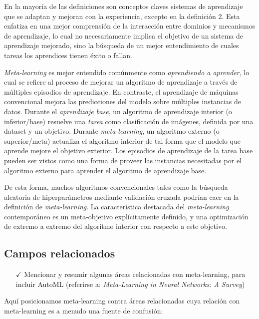 En la mayoría de las definiciones son conceptos claves sistemas de aprendizaje que se adaptan y mejoran con la experiencia, excepto en la definición 2. Esta enfatiza en una mejor comprensión de la interacción entre dominios y mecanismos de aprendizaje, lo cual no necesariamente implica el objetivo de un sistema de aprendizaje mejorado, sino la búsqueda de un mejor entendimiento de cuales tareas los aprendices tienen éxito o fallan.

\emph{Meta-learning} es mejor entendido comúnmente como \textit{aprendiendo a aprender}, lo cual se refiere al proceso de mejorar un algoritmo de aprendizaje a través de múltiples episodios de aprendizaje. En contraste, el aprendizaje de máquinas convencional mejora las predicciones del modelo sobre múltiples instancias de datos. Durante el \textit{aprendizaje base}, un algoritmo de aprendizaje interior (o inferior/base) resuelve una \textit{tarea} como clasificación de imágenes, definida por una dataset y un objetivo. Durante \emph{meta-learning}, un algoritmo externo (o superior/meta) actualiza el algoritmo interior de tal forma que el modelo que aprende mejore el objetivo exterior. Los episodios de aprendizaje de la tarea base pueden ser vistos como una forma de proveer las instancias necesitadas por el algoritmo externo para aprender el algoritmo de aprendizaje base. 

De esta forma, muchos algoritmos convencionales tales como la búsqueda aleatoria de hiperparámetros mediante validación cruzada podrían caer en la definición de \emph{meta-learning}. La característica destacada del \emph{meta-learning} contemporáneo es un meta-objetivo explícitamente definido, y una optimización de extremo a extremo del algoritmo interior con respecto a este objetivo.

\subsection{Campos relacionados}

\begin{itemize}
	\item[$\checkmark$] Mencionar y resumir algunas áreas relacionadas con meta-learning, para incluir AutoML (referirse a: \textit{Meta-Learning in Neural Networks: A Survey})
\end{itemize}

Aquí posicionamos meta-learning contra áreas relacionadas cuya relación con meta-learning es a menudo una fuente de confusión:

